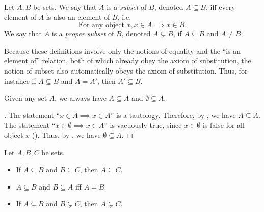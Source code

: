 \begin{defn}[Subsets]\label{i:3.1.15}
  Let \(A, B\) be sets.
  We say that \(A\) is a \emph{subset} of \(B\), denoted \(A \subseteq B\), iff every element of \(A\) is also an element of \(B\), i.e.
  \[
    \text{For any object } x, x \in A \implies x \in B.
  \]
  We say that \(A\) is a \emph{proper subset} of \(B\), denoted \(A \subsetneq B\), if \(A \subseteq B\) and \(A \neq B\).
\end{defn}

\begin{rmk}\label{i:3.1.16}
  Because these definitions involve only the notions of equality and the ``is an element of'' relation, both of which already obey the axiom of substitution, the notion of subset also automatically obeys the axiom of substitution.
  Thus, for instance if \(A \subseteq B\) and \(A = A'\), then \(A' \subseteq B\).
\end{rmk}

\begin{eg}\label{i:3.1.17}
  Given any set \(A\), we always have \(A \subseteq A\) and \(\emptyset \subseteq A\).
\end{eg}

\begin{proof}[]
  The statement ``\(x \in A \implies x \in A\)'' is a tautology.
  Therefore, by , we have \(A \subseteq A\).
  The statement ``\(x \in \emptyset \implies x \in A\)'' is vacuously true, since \(x \in \emptyset\) is false for all object \(x\) ().
  Thus, by , we have \(\emptyset \subseteq A\).
\end{proof}

\begin{prop}\label{i:3.1.18}
  Let \(A, B, C\) be sets.
  \begin{itemize}
    \item If \(A \subseteq B\) and \(B \subseteq C\), then \(A \subseteq C\).
    \item \(A \subseteq B\) and \(B \subseteq A\) iff \(A = B\).
    \item If \(A \subsetneq B\) and \(B \subsetneq C\), then \(A \subsetneq C\).
  \end{itemize}
\end{prop}

